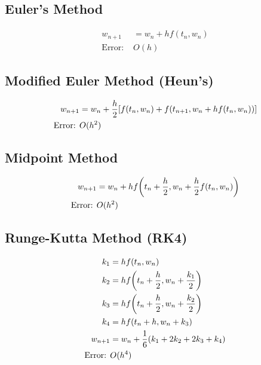 \documentclass[8pt, letterpaper]{extarticle}
\begin{document}
\begin{multicols*}{3}
  \subsection{Euler's Method}
  \begin{align*}
    w_{n+1} &= w_n + h f(t_n, w_n) \\
    \text{Error: } & O(h)
  \end{align*}

  \subsection{Modified Euler Method (Heun's)}
  \begin{align*}
    w_{n+1} &= w_n + \frac{h}{2} \qty[f(t_n, w_n) + f(t_{n+1}, w_n + h f(t_n, w_n))] \\
    \text{Error: } & O(h^2)
  \end{align*}

  \subsection{Midpoint Method}
  \begin{align*}
    w_{n+1} &= w_n + h f\qty(t_n + \frac{h}{2}, w_n + \frac{h}{2} f(t_n, w_n)) \\
    \text{Error: } & O(h^2)
  \end{align*}

  \subsection{Runge-Kutta Method (RK4)}
  \begin{align*}
    k_1 &= h f(t_n, w_n) \\
    k_2 &= h f\qty(t_n + \frac{h}{2}, w_n + \frac{k_1}{2}) \\
    k_3 &= h f\qty(t_n + \frac{h}{2}, w_n + \frac{k_2}{2}) \\
    k_4 &= h f(t_n + h, w_n + k_3) \\
    w_{n+1} &= w_n + \frac{1}{6}(k_1 + 2k_2 + 2k_3 + k_4) \\
    \text{Error: } & O(h^4)
  \end{align*}
\end{multicols*}
\end{document}
